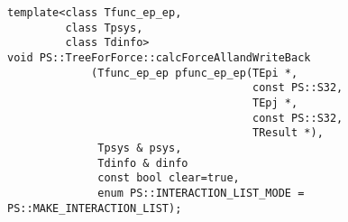 \label{sec:module_standard_treeforforce_calcforceallandwriteback}

\begin{screen}
\begin{verbatim}
template<class Tfunc_ep_ep,
         class Tpsys,
         class Tdinfo>
void PS::TreeForForce::calcForceAllandWriteBack
             (Tfunc_ep_ep pfunc_ep_ep(TEpi *,
                                      const PS::S32,
                                      TEpj *,
                                      const PS::S32,
                                      TResult *),
              Tpsys & psys,
              Tdinfo & dinfo
              const bool clear=true,
              enum PS::INTERACTION_LIST_MODE = PS::MAKE_INTERACTION_LIST);
\end{verbatim}
\end{screen}

